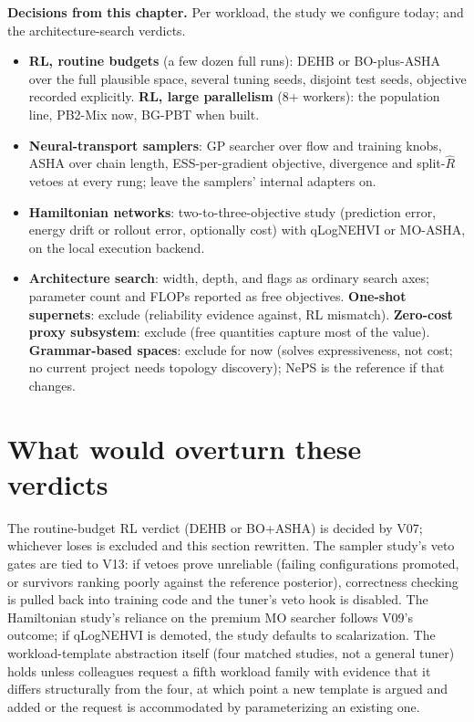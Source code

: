 \begin{decisions}
\noindent\textbf{Decisions from this chapter.} Per workload, the study
we configure today; and the architecture-search verdicts.
\begin{itemize}[leftmargin=1.3em, itemsep=2pt]
\item \textbf{RL, routine budgets} (a few dozen full runs): DEHB or
BO-plus-ASHA over the full plausible space, several tuning seeds,
disjoint test seeds, objective recorded explicitly. \textbf{RL, large
parallelism} (8+ workers): the population line, PB2-Mix now, BG-PBT
when built.
\item \textbf{Neural-transport samplers}: GP searcher over flow and
training knobs, ASHA over chain length, ESS-per-gradient objective,
divergence and split-$\widehat{R}$ vetoes at every rung; leave the
samplers' internal adapters on.
\item \textbf{Hamiltonian networks}: two-to-three-objective study
(prediction error, energy drift or rollout error, optionally cost)
with qLogNEHVI or MO-ASHA, on the local execution backend.
\item \textbf{Architecture search}: width, depth, and flags as
ordinary search axes; parameter count and FLOPs reported as free
objectives. \textbf{One-shot supernets}: exclude (reliability evidence
against, RL mismatch). \textbf{Zero-cost proxy subsystem}: exclude
(free quantities capture most of the value). \textbf{Grammar-based
spaces}: exclude for now (solves expressiveness, not cost; no current
project needs topology discovery); NePS is the reference if that
changes.
\end{itemize}
\end{decisions}

\section{What would overturn these verdicts}

The routine-budget RL verdict (DEHB or BO+ASHA) is decided by V07;
whichever loses is excluded and this section rewritten. The sampler
study's veto gates are tied to V13: if vetoes prove unreliable
(failing configurations promoted, or survivors ranking poorly
against the reference posterior), correctness checking is pulled
back into training code and the tuner's veto hook is disabled. The
Hamiltonian study's reliance on the premium MO searcher follows
V09's outcome; if qLogNEHVI is demoted, the study defaults to
scalarization. The workload-template abstraction itself (four
matched studies, not a general tuner) holds unless colleagues
request a fifth workload family with evidence that it differs
structurally from the four, at which point a new template is argued
and added or the request is accommodated by parameterizing an
existing one.
